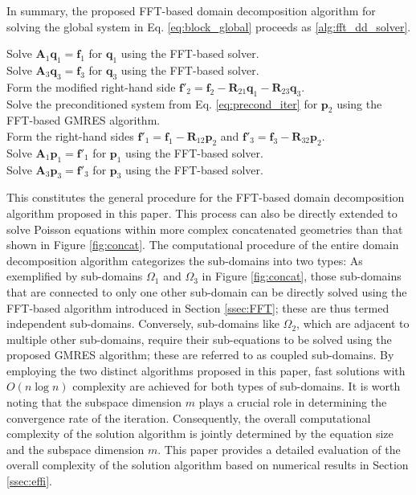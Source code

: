 \documentclass[preprint]{elsarticle}
\begin{document}
In summary, the proposed FFT-based domain decomposition algorithm for solving the global system in Eq. \eqref{eq:block_global} proceeds as \ref{alg:fft_dd_solver}.

\begin{algorithm}[H] %
\caption{FFT-based DDM algorithm}
\label{alg:fft_dd_solver}
    Solve $\boldsymbol{A}_{1}\boldsymbol{q}_{1}=\boldsymbol{f}_{1}$ for $\boldsymbol{q}_{1}$ using the FFT-based solver.\\
    Solve $\boldsymbol{A}_{3}\boldsymbol{q}_{3}=\boldsymbol{f}_{3}$ for $\boldsymbol{q}_{3}$ using the FFT-based solver.\\
    Form the modified right-hand side $\boldsymbol{f}'_{2} = \boldsymbol{f}_{2}-\boldsymbol{R}_{21}\boldsymbol{q}_{1}-\boldsymbol{R}_{23}\boldsymbol{q}_{3}$.\\
    Solve the preconditioned system from Eq. \eqref{eq:precond_iter} for $\boldsymbol{p}_{2}$ using the FFT-based GMRES algorithm.\\
    Form the right-hand sides $\boldsymbol{f}'_1 = \boldsymbol{f}_{1}-\boldsymbol{R}_{12}\boldsymbol{p}_{2}$ and $\boldsymbol{f}'_3 = \boldsymbol{f}_{3}-\boldsymbol{R}_{32}\boldsymbol{p}_{2}$.\\
    Solve $\boldsymbol{A}_{1}\boldsymbol{p}_{1}=\boldsymbol{f}'_1$ for $\boldsymbol{p}_{1}$ using the FFT-based solver.\\
    Solve $\boldsymbol{A}_{3}\boldsymbol{p}_{3}=\boldsymbol{f}'_3$ for $\boldsymbol{p}_{3}$ using the FFT-based solver.
\end{algorithm}

This constitutes the general procedure for the FFT-based domain decomposition algorithm proposed in this paper. This process can also be directly extended to solve Poisson equations within more complex concatenated geometries than that shown in Figure \ref{fig:concat}. The computational procedure of the entire domain decomposition algorithm categorizes the sub-domains into two types: As exemplified by sub-domains $\Omega_1$ and $\Omega_3$ in Figure \ref{fig:concat}, those sub-domains that are connected to only one other sub-domain can be directly solved using the FFT-based algorithm introduced in Section \ref{ssec:FFT}; these are thus termed independent sub-domains. Conversely, sub-domains like $\Omega_2$, which are adjacent to multiple other sub-domains, require their sub-equations to be solved using the proposed GMRES algorithm; these are referred to as coupled sub-domains. By employing the two distinct algorithms proposed in this paper, fast solutions with $O\left(n\log n\right)$ complexity are achieved for both types of sub-domains. It is worth noting that the subspace dimension $m$ plays a crucial role in determining the convergence rate of the iteration. Consequently, the overall computational complexity of the solution algorithm is jointly determined by the equation size and the subspace dimension $m$. This paper provides a detailed evaluation of the overall complexity of the solution algorithm based on numerical results in Section \ref{ssec:effi}.
\end{document}
